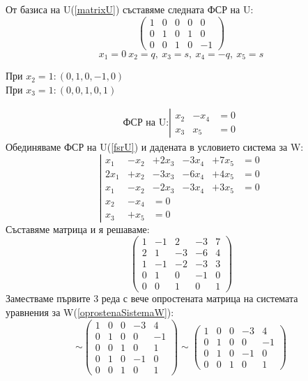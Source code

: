 \documentclass{article}
\begin{document}
От базиса на U(\ref*{matrixU}) съставяме следната ФСР на U:
\[
    \left(
    \begin{array}{ccccc}
            1 & 0 & 0 & 0 & 0  \\
            0 & 1 & 0 & 1 & 0  \\
            0 & 0 & 1 & 0 & -1
        \end{array}
    \right)
\]
\[
    x_1 = 0 \ x_2=q, \ x_3=s, \ x_4=-q, \ x_5=s
\]
\begin{center}
    При $x_2 = 1: (0, 1, 0, -1, 0)$ \\
    При $x_3 = 1: (0, 0, 1, 0, 1)$
\end{center}
\begin{align}\label{fsrU}
    \text{ФСР на U:}
    \left|\begin{array}{ccccc}
              x_2 & -x_4 & =0 \\
              x_3 & x_5  & =0
          \end{array}\right.
\end{align}
Обединяваме ФСР на U(\ref*{fsrU}) и дадената в условието система за W:
\[
    \left| \begin{array}{cccccc}
        x_1   & - x_2 & + 2 x_3 & - 3 x_4 & + 7 x_5 & =0 \\
        2 x_1 & + x_2 & - 3 x_3 & - 6 x_4 & + 4 x_5 & =0 \\
        x_1   & - x_2 & - 2 x_3 & - 3 x_4 & + 3 x_5 & =0 \\
        x_2   & - x_4 & =0                               \\
        x_3   & + x_5 & =0
    \end{array}
    \right.
\]
Съставяме матрица и я решаваме:
\[
    \left(\begin{array}{ccccc}
            1 & -1 & 2  & -3  & 7 \\
            2 & 1  & -3 & -6  & 4 \\
            1 & -1 & -2 & -3  & 3 \\
            0 & 1  & 0  & - 1 & 0 \\
            0 & 0  & 1  & 0   & 1
        \end{array}
    \right)
\]
Заместваме първите 3 реда с вече опростената матрица на системата\\ уравнения за W(\ref*{oprostenaSistemaW}):
\[
    \sim\left( \begin{array}{ccccc}
            1 & 0 & 0 & -3  & 4  \\
            0 & 1 & 0 & 0   & -1 \\
            0 & 0 & 1 & 0   & 1  \\
            0 & 1 & 0 & - 1 & 0  \\
            0 & 0 & 1 & 0   & 1
        \end{array}
    \right)
    \sim\left( \begin{array}{ccccc}
            1 & 0 & 0 & -3  & 4  \\
            0 & 1 & 0 & 0   & -1 \\
            0 & 1 & 0 & - 1 & 0  \\
            0 & 0 & 1 & 0   & 1
        \end{array}
    \right)
\]
\end{document}
